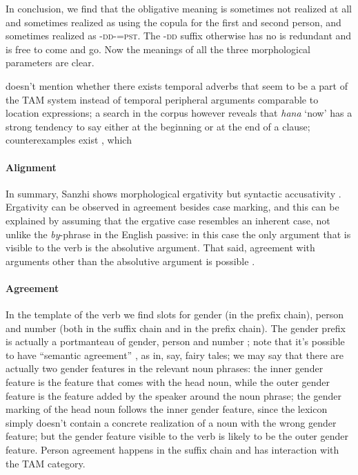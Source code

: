 \documentclass[a4paper, oneside, 12pt]{report}
\newcommand*{\citesec}[1]{\S~{#1}}
\newcommand*{\citetable}[1]{Table~{#1}}
\newcommand*{\citepage}[1]{p.~{#1}}
\newcommand{\form}[1]{\emph{#1}}
\newcommand{\category}[1]{\textsc{#1}}
\newcommand{\translate}[1]{`#1'}
\begin{document}
In conclusion, we find that the obligative meaning is sometimes not realized at all 
and sometimes realized as using the copula for the first and second person,
and sometimes realized as \category{-dd}-\category{=pst}.
The \category{-dd} suffix otherwise has no is redundant and is free to come and go.
Now the meanings of all the three morphological parameters are clear.

\citet{forker2020grammar} doesn't mention whether there exists 
temporal adverbs that seem to be a part of the TAM system 
instead of temporal peripheral arguments comparable to location expressions; 
a search in the corpus however reveals that 
\form{hana} \translate{now} has a strong tendency to say either 
at the beginning or at the end of a clause; 
counterexamples exist 
\citep[\citepage{292}, 37, 40]{forker2020grammar}, 
which 

\paragraph*{Alignment} In summary, Sanzhi shows morphological ergativity 
but syntactic accusativity \citep[\citesec{22.3}]{forker2020grammar}.
Ergativity can be observed in agreement besides case marking, 
and this can be explained by assuming that 
the ergative case resembles an inherent case, 
not unlike the \form{by}-phrase in the English passive:
in this case the only argument that is visible to the verb 
is the absolutive argument.
That said, agreement with arguments other than the absolutive argument
is possible \citep[\citesec{20.2.4}]{forker2020grammar}.

\paragraph*{Agreement} In the template of the verb 
we find slots for gender (in the prefix chain), person and number 
(both in the suffix chain and in the prefix chain). 
The gender prefix is actually a portmanteau of 
gender, person and number \citep[\citetable{20.1}]{forker2020grammar};
note that it's possible to have ``semantic agreement''
\citep[\citesec{20.2.2}]{forker2020grammar},
as in, say, fairy tales; 
we may say that there are actually two gender features in the 
relevant noun phrases:
the inner gender feature is the feature that comes with the head noun, 
while the outer gender feature is the feature 
added by the speaker around the noun phrase;
the gender marking of the head noun follows the inner gender feature, 
since the lexicon simply doesn't contain a concrete realization 
of a noun with the wrong gender feature;
but the gender feature visible to the verb 
is likely to be the outer gender feature. 
Person agreement happens in the suffix chain
and has interaction with the TAM category.
\end{document}

